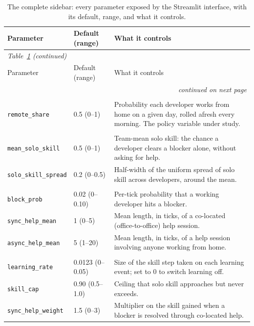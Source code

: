 \documentclass[11pt,a4paper]{article}
\begin{document}
{\footnotesize
\setlength{\tabcolsep}{5pt}
\setlength{\LTleft}{0pt plus 1fill}\setlength{\LTright}{0pt plus 1fill}
\begin{longtable}{llp{8.2cm}}
\caption{The complete sidebar: every parameter exposed by the Streamlit interface, with its default,
range, and what it controls.}\label{tab:ui-params}\\
\toprule
Parameter & Default (range) & What it controls \\
\midrule
\endfirsthead
\multicolumn{3}{l}{\itshape\small Table~\ref{tab:ui-params} (continued)}\\[2pt]
\toprule
Parameter & Default (range) & What it controls \\
\midrule
\endhead
\midrule
\multicolumn{3}{r}{\itshape\small continued on next page}\\
\endfoot
\bottomrule
\endlastfoot
\multicolumn{3}{l}{\textit{Headline}}\\
\texttt{remote\_share} & 0.5 (0--1) & Probability each developer works from home on a given day, rolled afresh every morning. The policy variable under study. \\
\addlinespace
\multicolumn{3}{l}{\textit{Team heterogeneity}}\\
\texttt{mean\_solo\_skill} & 0.5 (0--1) & Team-mean solo skill: the chance a developer clears a blocker alone, without asking for help. \\
\texttt{solo\_skill\_spread} & 0.2 (0--0.5) & Half-width of the uniform spread of solo skill across developers, around the mean. \\
\addlinespace
\multicolumn{3}{l}{\textit{Process}}\\
\texttt{block\_prob} & 0.02 (0--0.10) & Per-tick probability that a working developer hits a blocker. \\
\texttt{sync\_help\_mean} & 1 (0--5) & Mean length, in ticks, of a co-located (office-to-office) help session. \\
\texttt{async\_help\_mean} & 5 (1--20) & Mean length, in ticks, of a help session involving anyone working from home. \\
\addlinespace
\multicolumn{3}{l}{\textit{Learning}}\\
\texttt{learning\_rate} & 0.0123 (0--0.05) & Size of the skill step taken on each learning event; set to 0 to switch learning off. \\
\texttt{skill\_cap} & 0.90 (0.5--1.0) & Ceiling that solo skill approaches but never exceeds. \\
\texttt{sync\_help\_weight} & 1.5 (0--3) & Multiplier on the skill gained when a blocker is resolved through co-located help. \\

\end{longtable}}
\end{document}
